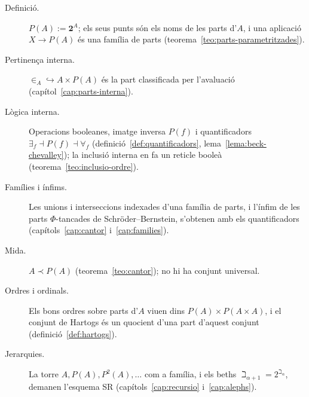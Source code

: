 \begin{description}
\item[Definició.] \(P(A):=\mathbf2^A\); els seus punts són els noms de les
parts d'\(A\), i una aplicació \(X\to P(A)\) és una família de parts
(teorema~\ref{teo:parts-parametritzades}).
\item[Pertinença interna.] \(\in_A\hookrightarrow A\times P(A)\) és la part
classificada per l'avaluació (capítol~\ref{cap:parts-interna}).
\item[Lògica interna.] Operacions booleanes, imatge inversa \(P(f)\) i
quantificadors \(\exists_f\dashv P(f)\dashv\forall_f\)
(definició~\ref{def:quantificadors}, lema~\ref{lema:beck-chevalley}); la
inclusió interna en fa un reticle booleà (teorema~\ref{teo:inclusio-ordre}).
\item[Famílies i ínfims.] Les unions i interseccions indexades d'una família
de parts, i l'ínfim de les parts \(\Phi\)-tancades de Schröder--Bernstein,
s'obtenen amb els quantificadors (capítols~\ref{cap:cantor}
i~\ref{cap:families}).
\item[Mida.] \(A\prec P(A)\) (teorema~\ref{teo:cantor}); no hi ha conjunt
universal.
\item[Ordres i ordinals.] Els bons ordres sobre parts d'\(A\) viuen dins
\(P(A)\times P(A\times A)\), i el conjunt de Hartogs és un quocient d'una
part d'aquest conjunt (definició~\ref{def:hartogs}).
\item[Jerarquies.] La torre \(A,P(A),P^2(A),\dots\) com a família, i els
beths \(\beth_{\alpha+1}=2^{\beth_\alpha}\), demanen l'esquema SR
(capítols~\ref{cap:recursio} i~\ref{cap:alephs}).
\end{description}
